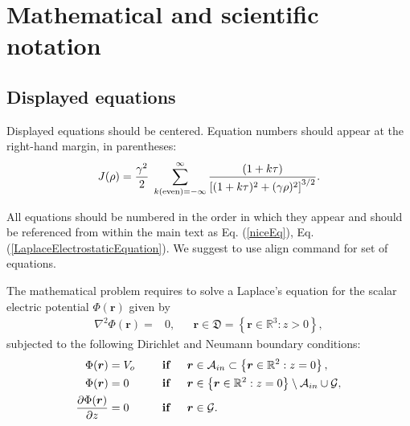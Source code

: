 \documentclass[12pt, a4paper]{article}
\begin{document}
\section{Mathematical and scientific notation}

\subsection{Displayed equations} Displayed equations should be centered.
Equation numbers should appear at the right-hand margin, in
parentheses:
\begin{equation}
	J(\rho) =
	\frac{\gamma^2}{2} \; \sum_{k({\rm even}) = -\infty}^{\infty}
	\frac{(1 + k \tau)}{ \left[ (1 + k \tau)^2 + (\gamma  \rho)^2  \right]^{3/2} }.
	\label{niceEq}
\end{equation}

All equations should be numbered in the order in which they appear
and should be referenced  from within the main text as Eq. (\ref{niceEq}),
Eq. (\ref{LaplaceElectrostaticEquation}). We suggest to use align command for set of equations.

The mathematical problem requires to solve a Laplace's equation for the scalar electric potential $\Phi(\boldsymbol{r})$ given by
\begin{align}
	\nabla^2 \Phi(\boldsymbol{r}) = & 0, &  & \boldsymbol{r} \in \mathfrak{D}=\left\{\boldsymbol{r} \in \mathbb{R}^3 : z > 0 \right\}, \label{LaplaceElectrostaticEquation}
\end{align}{}
subjected to the following Dirichlet and Neumann boundary conditions:
\begin{align}
	\Phi(\boldsymbol{r})                             & = V_o  \hspace{0.5cm} &  & \mbox{\textbf{if}} \hspace{0.5cm} \boldsymbol{r} \in \mathcal{A}_{in} \subset \left\{\boldsymbol{r} \in \mathbb{R}^2 : z = 0 \right\},\label{DirichletBoundaryConditionsEq1} \\
	\Phi(\boldsymbol{r})                             & = 0 \hspace{0.5cm}    &  & \mbox{\textbf{if}} \hspace{0.5cm} \boldsymbol{r} \in \left\{\boldsymbol{r} \in \mathbb{R}^2 : z = 0 \right\}\setminus\mathcal{A}_{in}\cup\mathcal{G},
	\label{DirichletBoundaryConditionsEq2}                                                                                                                                                                                                                     \\
	\frac{\partial \Phi(\boldsymbol{r})}{\partial z} & =0                    &  & \mbox{\textbf{if}} \hspace{0.5cm} \boldsymbol{r} \in \mathcal{G}.
	\label{NeumannBoundaryConditionsEq}
\end{align}
\end{document}
